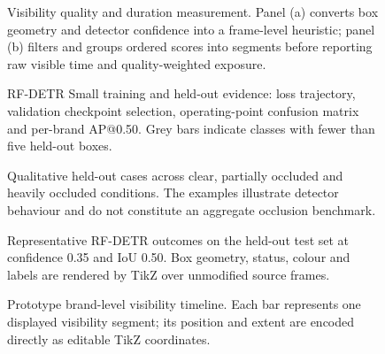 \documentclass[10pt,a4paper]{article}
\begin{document}
\begin{figure}[p]
  \centering
  \resizebox{\textwidth}{!}{}
  \caption[Visibility quality and duration aggregation]{Visibility quality and
  duration measurement. Panel (a) converts box geometry and detector confidence
  into a frame-level heuristic; panel (b) filters and groups ordered scores into
  segments before reporting raw visible time and quality-weighted exposure.}
  \label{fig:visibility-tikz}
\end{figure}
\clearpage

\begin{figure}[p]
  \centering
  
  \caption[RF-DETR training and held-out evidence]{RF-DETR Small training and
  held-out evidence: loss trajectory, validation checkpoint selection,
  operating-point confusion matrix and per-brand AP@0.50. Grey bars indicate
  classes with fewer than five held-out boxes.}
  \label{fig:training-pgf}
\end{figure}
\clearpage

\begin{figure}[p]
  \centering
  
  \caption[Qualitative held-out occlusion examples]{Qualitative held-out cases
  across clear, partially occluded and heavily occluded conditions. The examples
  illustrate detector behaviour and do not constitute an aggregate occlusion
  benchmark.}
  \label{fig:occlusion-tikz}
\end{figure}
\clearpage

\begin{figure}[p]
  \centering
  
  \caption[Representative successes and failure modes]{Representative RF-DETR
  outcomes on the held-out test set at confidence 0.35 and IoU 0.50. Box geometry,
  status, colour and labels are rendered by TikZ over unmodified source frames.}
  \label{fig:examples-tikz}
\end{figure}
\clearpage

\begin{figure}[p]
  \centering
  \resizebox{\textwidth}{!}{}
  \caption[Prototype brand-level visibility timeline]{Prototype brand-level
  visibility timeline. Each bar represents one displayed visibility segment;
  its position and extent are encoded directly as editable TikZ coordinates.}
  \label{fig:timeline-tikz}
\end{figure}
\end{document}
